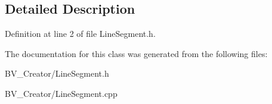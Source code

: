 \subsection{Detailed Description}


Definition at line 2 of file LineSegment.h.

The documentation for this class was generated from the following files:\begin{DoxyCompactItemize}
\item 
BV\_\-Creator/LineSegment.h\item 
BV\_\-Creator/LineSegment.cpp\end{DoxyCompactItemize}
